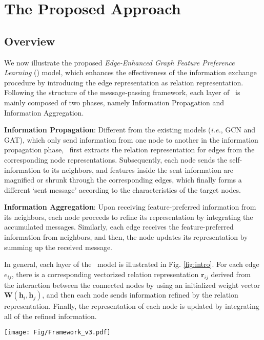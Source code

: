 \section{The Proposed Approach}
\label{sec:method}

\par\smallskip\noindent
\subsection{Overview}
We now illustrate the proposed \emph{Edge-Enhanced Graph Feature Preference Learning} (\alg) model, which enhances the effectiveness of the information exchange procedure by introducing the edge representation as relation representation. 
%
Following the structure of the message-passing framework, each layer of \alg\ is mainly composed of two phases, namely Information Propagation and Information Aggregation.
    
\textbf{Information Propagation}: Different from the existing models (\emph{i.e.}, GCN and GAT), which only send information from one node to another in the information propagation phase, \alg\ first extracts the relation representation for edges from the corresponding node representations. 
Subsequently, each node sends the self-information to its neighbors, and features inside the sent information are magnified or shrunk through the corresponding edges, which finally forms a different ‘sent message’ according to the characteristics of the target nodes.

\textbf{Information Aggregation}: Upon receiving feature-preferred information from its neighbors, each node proceeds to refine its representation by integrating the accumulated messages.
Similarly, each edge receives the feature-preferred information from neighbors, and then, the node updates its representation by summing up the received message.

In general, each layer of the \alg~model is illustrated in Fig. \ref{fig:intro}. 
%
For each edge $e_{ij}$, there is a corresponding vectorized relation representation $\mathbf{r}_{ij}$ derived from the interaction between the connected nodes by using an initialized weight vector $\mathbf{W}(\mathbf{h}_{i}, \mathbf{h}_{j})$, and then each node sends information refined by the relation representation. 
%
Finally, the representation of each node is updated by integrating all of the refined information.

\begin{figure*}[!t]
    \centering
    \texttt{[image: Fig/Framework\_v3.pdf]}
    \caption{Illustration of the $l$-th layer of the \alg~model. The \alg~model achieves the final representation of the target node in a heterogeneous graph through node and edge embeddings, information propagation, and aggregation processes.}
    \label{fig:intro}
\end{figure*}

